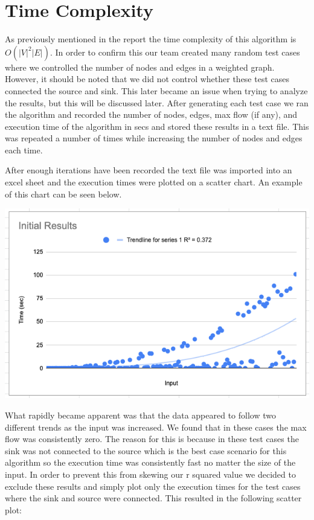 \documentclass{report}
\begin{document}
\section{Time Complexity}
As previously mentioned in the report the time complexity of this algorithm is $O(|V|^2|E|)$. In order to confirm this our team created many random test cases where we controlled the number of nodes and edges in a weighted graph. However, it should be noted that we did not control whether these test cases connected the source and sink. This later became an issue when trying to analyze the results, but this will be discussed later. After generating each test case we ran the algorithm and recorded the number of nodes, edges, max flow (if any), and execution time of the algorithm in secs and stored these results in a text file. This was repeated a number of times while increasing the number of nodes and edges each time.

After enough iterations have been recorded the text file was imported into an excel sheet and the execution times were plotted on a scatter chart. An example of this chart can be seen below.

\includegraphics[width=\textwidth]{assets/Josh1.png}

What rapidly became apparent was that the data appeared to follow two different trends as the input was increased. We found that in these cases the max flow was consistently zero. The reason for this is because in these test cases the sink was not connected to the source which is the best case scenario for this algorithm so the execution time was consistently fast no matter the size of the input. In order to prevent this from skewing our r squared value we decided to exclude these results and simply plot only the execution times for the test cases where the sink and source were connected. This resulted in the following scatter plot:
\end{document}
